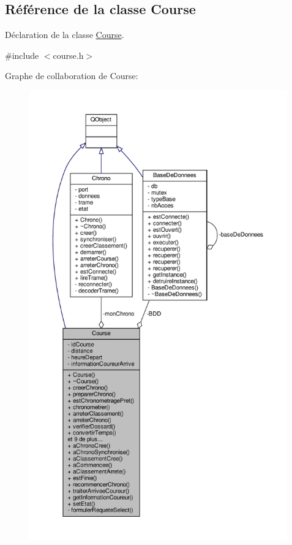\hypertarget{class_course}{}\subsection{Référence de la classe Course}
\label{class_course}


Déclaration de la classe \hyperlink{class_course}{Course}.  




{\ttfamily \#include $<$course.\+h$>$}



Graphe de collaboration de Course\+:\nopagebreak
\begin{figure}[H]
\begin{center}
\leavevmode
\includegraphics[height=550pt]{class_course__coll__graph}
\end{center}
\end{figure}
